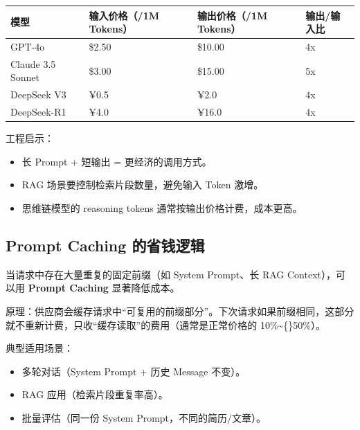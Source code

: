 \documentclass[9pt,a4paper,twocolumn]{ctexart}
\begin{document}
{\footnotesize
\begin{tabular}{|p{}|p{}|p{}|p{}|}
\hline
\textbf{模型} & \textbf{输入价格（/1M Tokens）} & \textbf{输出价格（/1M Tokens）} & \textbf{输出/输入比} \\
\hline
GPT-4o & \$2.50 & \$10.00 & 4x \\
\hline
Claude 3.5 Sonnet & \$3.00 & \$15.00 & 5x \\
\hline
DeepSeek V3 & ¥0.5 & ¥2.0 & 4x \\
\hline
DeepSeek-R1 & ¥4.0 & ¥16.0 & 4x \\
\hline
\end{tabular}
}



工程启示：


\begin{itemize}[itemsep=1pt, topsep=2pt]
  \item 长 Prompt + 短输出 = 更经济的调用方式。
  \item RAG 场景要控制检索片段数量，避免输入 Token 激增。
  \item 思维链模型的 reasoning tokens 通常按输出价格计费，成本更高。
\end{itemize}


\subsection*{Prompt Caching 的省钱逻辑}


当请求中存在大量重复的固定前缀（如 System Prompt、长 RAG Context），可以用 \textbf{Prompt Caching} 显著降低成本。



原理：供应商会缓存请求中“可复用的前缀部分”。下次请求如果前缀相同，这部分就不重新计费，只收“缓存读取”的费用（通常是正常价格的 10\%\textasciitilde\{\}50\%）。



典型适用场景：


\begin{itemize}[itemsep=1pt, topsep=2pt]
  \item 多轮对话（System Prompt + 历史 Message 不变）。
  \item RAG 应用（检索片段重复率高）。
  \item 批量评估（同一份 System Prompt，不同的简历/文章）。
\end{itemize}
\end{document}
